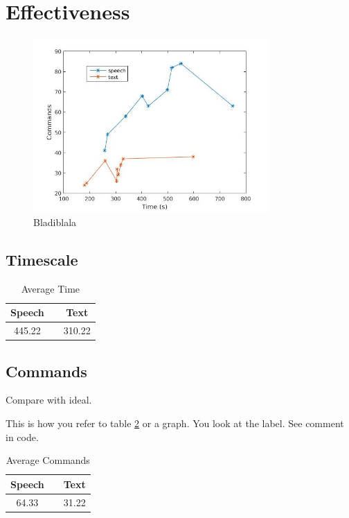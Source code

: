 \section{Effectiveness}

\begin{figure}[p]
  \centering
  \includegraphics[width=0.8\textwidth]{images/time_cmd.jpg} %
  \caption{Bladiblala}\label{time_cmd}
\end{figure}

\subsection{Timescale}

\begin{table}[h!]
  \centering
  \begin{tabular}{ccc}
    \toprule
    Speech &   & Text\\
    \midrule
    445.22 &   & 310.22\\
    \bottomrule
  \end{tabular}
  \caption{Average Time}\label{avg_time}
\end{table}

\subsection{Commands}
Compare with ideal.

This is how you refer to table \ref{avg_cmd} or a graph. You look at the label. See comment in code.

\begin{table}[h!]
  \centering
  \begin{tabular}{ccc}
    \toprule
    Speech &   & Text\\
    \midrule
    64.33 &   & 31.22\\
    \bottomrule
  \end{tabular}
  \caption{Average Commands}\label{avg_cmd} %
\end{table}

